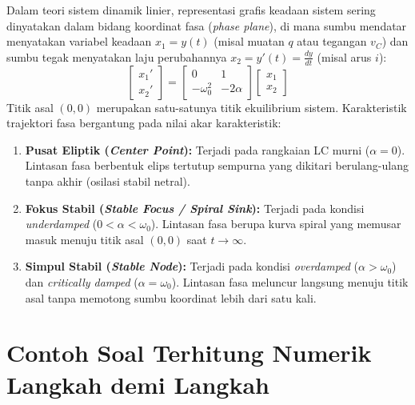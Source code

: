 \documentclass[11pt,a4paper]{article}
\theoremstyle{definition}
\begin{document}
Dalam teori sistem dinamik linier, representasi grafis keadaan sistem sering dinyatakan dalam bidang koordinat fasa (\textit{phase plane}), di mana sumbu mendatar menyatakan variabel keadaan $x_1 = y(t)$ (misal muatan $q$ atau tegangan $v_C$) dan sumbu tegak menyatakan laju perubahannya $x_2 = y'(t) = \frac{dy}{dt}$ (misal arus $i$):
\begin{equation}
    \begin{bmatrix} x_1' \\ x_2' \end{bmatrix} = \begin{bmatrix} 0 & 1 \\ -\omega_0^2 & -2\alpha \end{bmatrix} \begin{bmatrix} x_1 \\ x_2 \end{bmatrix}
    \label{eq:state_space_rlc}
\end{equation}
Titik asal $(0,0)$ merupakan satu-satunya titik ekuilibrium sistem. Karakteristik trajektori fasa bergantung pada nilai akar karakteristik:
\begin{enumerate}[leftmargin=*]
    \item \textbf{Pusat Eliptik (\textit{Center Point}):} Terjadi pada rangkaian LC murni ($\alpha = 0$). Lintasan fasa berbentuk elips tertutup sempurna yang dikitari berulang-ulang tanpa akhir (osilasi stabil netral).
    \item \textbf{Fokus Stabil (\textit{Stable Focus / Spiral Sink}):} Terjadi pada kondisi \textit{underdamped} ($0 < \alpha < \omega_0$). Lintasan fasa berupa kurva spiral yang memusar masuk menuju titik asal $(0,0)$ saat $t \to \infty$.
    \item \textbf{Simpul Stabil (\textit{Stable Node}):} Terjadi pada kondisi \textit{overdamped} ($\alpha > \omega_0$) dan \textit{critically damped} ($\alpha = \omega_0$). Lintasan fasa meluncur langsung menuju titik asal tanpa memotong sumbu koordinat lebih dari satu kali.
\end{enumerate}

\section{Contoh Soal Terhitung Numerik Langkah demi Langkah}
\end{document}
